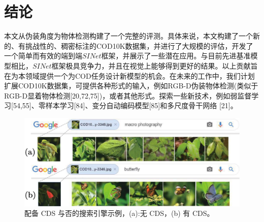 \documentclass[final]{cvpr}
\begin{document}
\section{结论}\label{sec:Conclusion}
本文从伪装角度为物体检测构建了一个完整的评测。具体来说，本文构建了一个新的、有挑战性的、稠密标注的COD10K数据集，并进行了大规模的评估，开发了一个简单而有效的端到端$SINet$框架，并展示了一些潜在应用。与目前先进基准模型相比，$SINet$框架极具竞争力，并且在视觉上能够得到更好的结果。以上贡献旨在为本领域提供一个为COD任务设计新模型的机会。在未来的工作中，我们计划扩展COD10K数据集，可提供各种形式的输入，例如RGB-D伪装物体检测(类似于RGB-D显着物体检测[20,72,75])，或者其他形式。探索一些新技术，例如弱监督学习[54,55]、零样本学习[84]、变分自动编码模型[85]和多尺度骨干网络 [21]。

\begin{figure}[tp]
    \centering
    \includegraphics[width=\columnwidth]{COD_Zh_translate/figures/Application_SearchEngin.png}\small
    \caption{配备 CDS 与否的搜索引擎示例，(a):无 CDS，(b)
    有 CDS。}
    \label{fig:Application_SearchEngin}
\end{figure}



% 
% 

\end{document}
